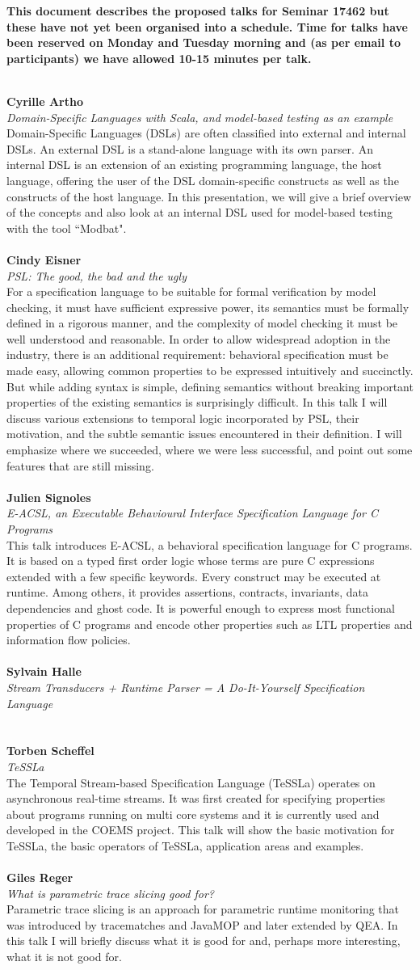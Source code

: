 \documentclass{article}
\newcommand{\talk}[3]{
\vspace{0.5em}~\\
\noindent
\textbf{#1}\\ 
\noindent\emph{#2}\\ 
\noindent#3\\
}
\begin{document}
\noindent
\textbf{\color{red}This document describes the proposed talks for Seminar 17462 but these have not yet been organised into a schedule. Time for talks have been reserved on Monday and Tuesday morning and (as per email to participants) we have allowed 10-15 minutes per talk.}

\talk{Cyrille Artho}{Domain-Specific Languages with Scala, and model-based testing as an example}
{Domain-Specific Languages (DSLs) are often classified into external and internal DSLs. An external DSL is a stand-alone language with its own parser. An internal DSL is an extension of an existing programming language, the host language, offering the user of the DSL domain-specific constructs as well as the constructs of the host language. In this presentation, we will give a brief overview of the concepts and also look at an internal DSL used for model-based testing with the tool ``Modbat".}
\talk{Cindy Eisner}{PSL: The good, the bad and the ugly}{For a specification language to be suitable for formal verification by model checking, it must have sufficient expressive power, its semantics must be formally defined in a rigorous manner, and the complexity of model checking it must be well understood and reasonable. In order to allow widespread adoption in the industry, there is an additional requirement: behavioral specification must be made easy, allowing common properties to be expressed intuitively and succinctly. But while adding syntax is simple, defining semantics without breaking important properties of the existing semantics is surprisingly difficult. In this talk I will discuss various extensions to temporal logic incorporated by PSL, their motivation, and the subtle semantic issues encountered in their definition. I will emphasize where we succeeded, where we were less successful, and point out some features that are still missing.}
\talk{Julien Signoles}{E-ACSL, an Executable Behavioural Interface Specification Language for C Programs}{This talk introduces E-ACSL, a behavioral specification language for C programs. It is based on a typed first order logic whose terms are pure C expressions extended with a few specific keywords. Every construct may be executed at runtime. Among others, it provides assertions, contracts, invariants, data dependencies and ghost code. It is powerful enough to express most functional properties of C programs and encode other properties such as LTL properties and information flow policies.}
\talk{Sylvain Halle}{Stream Transducers + Runtime Parser = A Do-It-Yourself Specification Language}{}
\talk{Torben Scheffel}{TeSSLa}{The Temporal Stream-based Specification Language (TeSSLa) operates on asynchronous real-time streams. It was first created for specifying properties about programs running on multi core systems and it is currently used and developed in the COEMS project. This talk will show the basic motivation for TeSSLa, the basic operators of TeSSLa, application areas and examples.}
\talk{Giles Reger}{What is parametric trace slicing good for?}{Parametric trace slicing is an approach for parametric runtime monitoring that was introduced by tracematches and JavaMOP and later extended by QEA. In this talk I will briefly discuss what it is good for and, perhaps more interesting, what it is not good for.}
\end{document}
